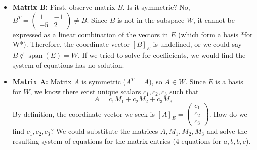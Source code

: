 \documentclass[11pt]{article}
\theoremstyle{definition}
\theoremstyle{remark}
\newcommand{\mat}[1]{\begin{pmatrix}#1\end{pmatrix}}
\DeclareMathOperator{\spn}{span}
\begin{document}
\begin{itemize}
    \item \textbf{Matrix B:} First, observe matrix $B$. Is it symmetric? No, $B^T = \mat{1 & -1 \\ -5 & 2} \neq B$. Since $B$ is not in the subspace $W$, it cannot be expressed as a linear combination of the vectors in $E$ (which form a basis *for W*). Therefore, the coordinate vector $[B]_E$ is undefined, or we could say $B \notin \spn(E) = W$. If we tried to solve for coefficients, we would find the system of equations has no solution.

    \item \textbf{Matrix A:} Matrix $A$ is symmetric ($A^T = A$), so $A \in W$. Since $E$ is a basis for $W$, we know there exist unique scalars $c_1, c_2, c_3$ such that
        \[ A = c_1 M_1 + c_2 M_2 + c_3 M_3 \]
        By definition, the coordinate vector we seek is $[A]_E = \mat{c_1 \\ c_2 \\ c_3}$.
        How do we find $c_1, c_2, c_3$? We could substitute the matrices $A, M_1, M_2, M_3$ and solve the resulting system of equations for the matrix entries (4 equations for $a,b,b,c$).


\end{itemize}
\end{document}
